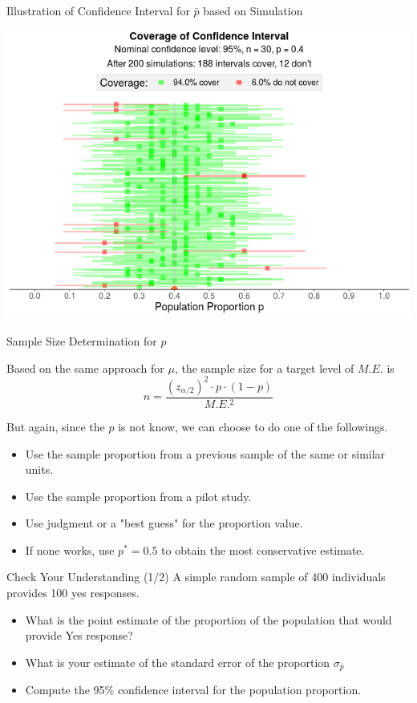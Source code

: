 \documentclass{beamer}
\begin{document}
\begin{frame}{Illustration of Confidence Interval for $\bar{p}$ based on Simulation}

\begin{center}
\includegraphics[width = 250 px]{images/section5ConfidenceIntervalP.png}
\end{center}

\end{frame}



\begin{frame}{Sample Size Determination for $p$}

Based on the same approach for $\mu$, the sample size for a target level of $M.E.$ is 
$$n = \frac{(z_{\alpha/2})^2\cdot p \cdot (1-p)}{M.E.^2}$$

But again, since the $p$ is not know, we can choose to do one of the followings.
\begin{itemize}
\item Use the sample proportion from a previous sample of the same or similar units.
\item Use the sample proportion from a pilot study.
\item Use judgment or a "best guess" for the proportion value. 
\item If none works, use $p^* = 0.5$ to obtain the most conservative estimate. 
\end{itemize}

\end{frame}

\begin{frame}{Check Your Understanding (1/2)}
A simple random sample of 400 individuals provides 100 yes responses. 
\begin{itemize}
\item What is the point estimate of the proportion of the population that would provide Yes response?
\item What is your estimate of the standard error of the proportion $\sigma_{\bar{p}}$
\item Compute the 95\% confidence interval for the population proportion. 

\end{itemize}
\end{frame}
\end{document}
